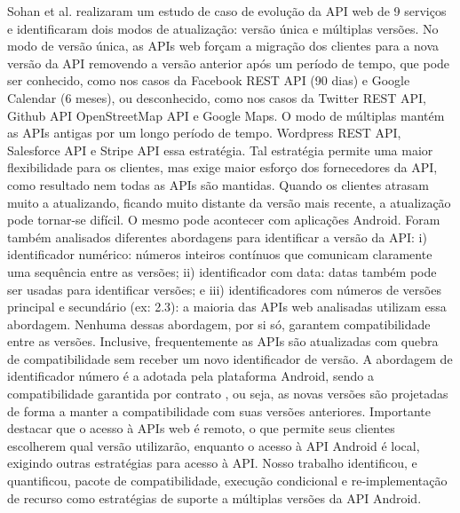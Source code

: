 Sohan et al. \cite{Sohan2015} realizaram um estudo de caso de evolução da API
web de 9 serviços e identificaram dois modos de atualização: versão única e
múltiplas versões. No modo de versão única, as APIs web forçam a migração dos
clientes para a nova versão da API removendo a versão anterior após um período
de tempo, que pode ser conhecido, como nos casos da Facebook REST API (90 dias)
e Google Calendar (6 meses), ou desconhecido, como nos casos da Twitter REST API,
Github API OpenStreetMap API e Google Maps. O modo de múltiplas mantém as APIs
antigas por um longo período de tempo. Wordpress REST API, Salesforce API e Stripe
API essa estratégia. Tal estratégia permite uma maior flexibilidade para os clientes,
mas exige maior esforço dos fornecedores da API, como resultado nem todas as APIs são
mantidas. Quando os clientes atrasam muito a atualizando, ficando muito distante da
versão mais recente, a atualização pode tornar-se difícil. O mesmo pode acontecer
com aplicações Android. Foram também analisados diferentes abordagens para identificar
a versão da API: i) identificador numérico: números inteiros contínuos que comunicam
claramente uma sequência entre as versões; ii) identificador com data: datas também
pode ser usadas para identificar versões; e iii) identificadores com números de versões
principal e secundário (ex: 2.3): a maioria das APIs web analisadas utilizam essa
abordagem. Nenhuma dessas abordagem, por si só, garantem compatibilidade entre as versões.
Inclusive, frequentemente as APIs são atualizadas com quebra de compatibilidade sem receber
um novo identificador de versão. A abordagem de identificador número é a adotada pela
plataforma Android, sendo a compatibilidade garantida por contrato \cite{ApiLevels},
ou seja, as novas versões são projetadas de forma a manter a compatibilidade com suas
versões anteriores.   Importante destacar que o acesso à APIs web é remoto, o que permite
seus clientes escolherem qual versão utilizarão, enquanto o acesso à API Android é local,
exigindo outras estratégias para acesso à API. Nosso trabalho identificou, e quantificou,
pacote de compatibilidade, execução condicional e re-implementação de recurso como estratégias
de suporte a múltiplas versões da API Android.